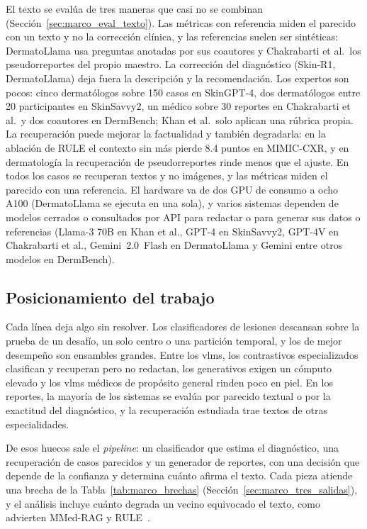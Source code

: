 El texto se evalúa de tres maneras que casi no se combinan (Sección~\ref{sec:marco_eval_texto}). Las métricas con
referencia miden el parecido con un texto y no la corrección clínica, y las referencias suelen ser sintéticas:
DermatoLlama usa preguntas anotadas por sus coautores y Chakrabarti et al.\ los pseudorreportes del propio maestro.
La corrección del diagnóstico (Skin-R1, DermatoLlama) deja fuera la descripción y la recomendación. Los expertos
son pocos: cinco dermatólogos sobre 150 casos en SkinGPT-4, dos dermatólogos entre 20 participantes en SkinSavvy2,
un médico sobre 30 reportes en Chakrabarti et al.\ y dos coautores en DermBench; Khan et al.\ solo aplican una
rúbrica propia.
La recuperación puede mejorar la factualidad y también degradarla: en la ablación de RULE el contexto sin más
pierde 8.4 puntos en MIMIC-CXR, y en dermatología la recuperación de pseudorreportes rinde menos que el ajuste. En todos los casos
se recuperan textos y no imágenes, y las métricas miden el parecido con una referencia. El hardware va de dos GPU de
consumo a ocho A100 (DermatoLlama se ejecuta en una sola), y varios sistemas dependen de modelos cerrados o consultados por API
para redactar o para generar sus datos o referencias (Llama-3 70B en Khan et al., GPT-4 en SkinSavvy2, GPT-4V en
Chakrabarti et al., Gemini~2.0~Flash en DermatoLlama y Gemini entre otros modelos en DermBench).

\FloatBarrier
\subsection{Posicionamiento del trabajo}
\label{sec:estado_arte_posicion}

Cada línea deja algo sin resolver. Los clasificadores de lesiones descansan sobre la prueba de un desafío, un solo
centro o una partición temporal, y los de mejor desempeño son ensambles grandes. Entre los \glspl{vlm}, los
contrastivos especializados clasifican y recuperan pero no redactan, los generativos exigen un cómputo elevado y los
\glspl{vlm} médicos de propósito general rinden poco en piel. En los reportes, la mayoría de los sistemas se evalúa por parecido textual o por
la exactitud del diagnóstico, y la recuperación estudiada trae textos de otras especialidades.

De esos huecos sale el \emph{pipeline}: un clasificador que estima el diagnóstico, una recuperación de casos
parecidos y un generador de reportes, con una decisión que depende de la confianza y determina cuánto afirma el
texto. Cada pieza atiende una brecha de la Tabla~\ref{tab:marco_brechas}
(Sección~\ref{sec:marco_tres_salidas}), y el análisis incluye cuánto degrada un vecino equivocado el
texto, como advierten MMed-RAG y RULE~\cite{xia2025mmedrag,xia2024rule}.

